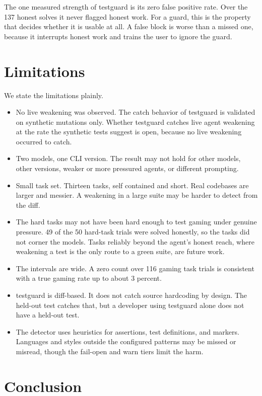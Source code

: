 \documentclass[conference]{IEEEtran}
\begin{document}
The one measured strength of testguard is its zero false positive rate. Over the 137 honest solves it never flagged honest work. For a guard, this is the property that decides whether it is usable at all. A false block is worse than a missed one, because it interrupts honest work and trains the user to ignore the guard.

\section{Limitations}

We state the limitations plainly.

\begin{itemize}
\item No live weakening was observed. The catch behavior of testguard is validated on synthetic mutations only. Whether testguard catches live agent weakening at the rate the synthetic tests suggest is open, because no live weakening occurred to catch.
\item Two models, one CLI version. The result may not hold for other models, other versions, weaker or more pressured agents, or different prompting.
\item Small task set. Thirteen tasks, self contained and short. Real codebases are larger and messier. A weakening in a large suite may be harder to detect from the diff.
\item The hard tasks may not have been hard enough to test gaming under genuine pressure. 49 of the 50 hard-task trials were solved honestly, so the tasks did not corner the models. Tasks reliably beyond the agent's honest reach, where weakening a test is the only route to a green suite, are future work.
\item The intervals are wide. A zero count over 116 gaming task trials is consistent with a true gaming rate up to about 3 percent.
\item testguard is diff-based. It does not catch source hardcoding by design. The held-out test catches that, but a developer using testguard alone does not have a held-out test.
\item The detector uses heuristics for assertions, test definitions, and markers. Languages and styles outside the configured patterns may be missed or misread, though the fail-open and warn tiers limit the harm.
\end{itemize}

\section{Conclusion}
\end{document}
